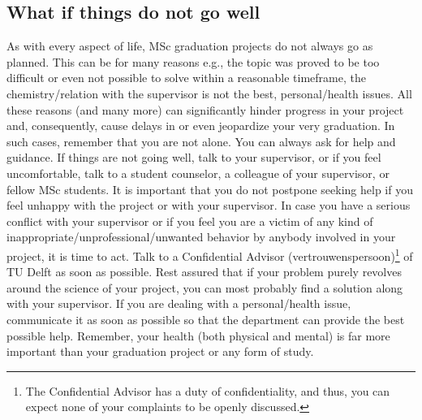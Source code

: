 \documentclass{article}
\begin{document}
\subsection{What if things do not go well}
As with every aspect of life, MSc graduation projects do not always go as planned. This can be for many reasons e.g., the topic was proved to be too difficult or even not possible to solve within a reasonable timeframe, the chemistry/relation with the supervisor is not the best, personal/health issues. All these reasons (and many more) can significantly hinder progress in your project and, consequently, cause delays in or even jeopardize your very graduation. In such cases, remember that you are not alone. You can always ask for help and guidance. If things are not going well, talk to your supervisor, or if you feel uncomfortable, talk to a student counselor, a colleague of your supervisor, or fellow MSc students. It is important that you do not postpone seeking help if you feel unhappy with the project or with your supervisor. In case you have a serious conflict with your supervisor or if you feel you are a victim of any kind of inappropriate/unprofessional/unwanted behavior by anybody involved in your project, it is time to act. Talk to a Confidential Advisor (vertrouwenspersoon)\footnote{The Confidential Advisor has a duty of confidentiality, and thus, you can expect none of your complaints to be openly discussed.} of TU Delft as soon as possible.  Rest assured that if your problem purely revolves around the science of your project, you can most probably find a solution along with your supervisor. If you are dealing with a personal/health issue, communicate it as soon as possible so that the department can provide the best possible help. Remember, your health (both physical and mental) is far more important than your graduation project or any form of study. 
\end{document}
